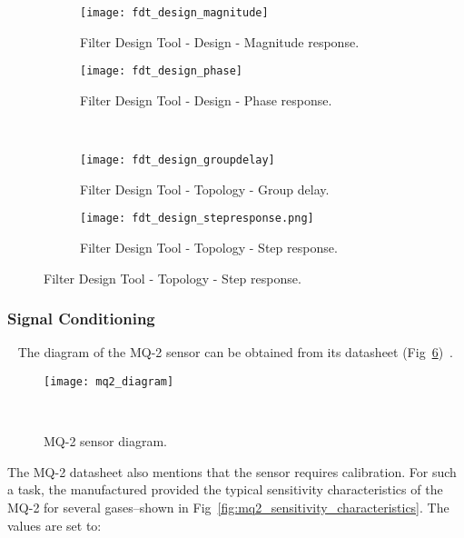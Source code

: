 \begin{figure}[H]
    \centering
    \begin{subfigure}[t]{0.9\textwidth}
        \centering
        \texttt{[image: fdt\_design\_magnitude]}
        \caption{Filter Design Tool - Design - Magnitude response.}
        \label{fig:fdt_design:magnitude}
    \end{subfigure}
    \begin{subfigure}[t]{0.9\textwidth}
        \centering
        \texttt{[image: fdt\_design\_phase]}
        \caption{Filter Design Tool - Design - Phase response.}
        \label{fig:fdt_design:phase}
    \end{subfigure}
    \\
    \centering
    \begin{subfigure}[t]{0.9\textwidth}
        \centering
        \texttt{[image: fdt\_design\_groupdelay]}
        \caption{Filter Design Tool - Topology - Group delay.}
        \label{fig:fdt_design:group_delay}
    \end{subfigure}
    \begin{subfigure}[t]{0.9\textwidth}
        \centering
        \texttt{[image: fdt\_design\_stepresponse.png]}
        \caption{Filter Design Tool - Topology - Step response.}
        \label{fig:fdt_design:step_response}
    \end{subfigure}
    \label{fig:fdt_design}
\end{figure}


\subsubsection{Signal Conditioning}
~\label{sec:methodology:dev_methodology:sc}
\hspace{8pt}
The diagram of the MQ-2 sensor can be obtained from its datasheet (Fig~\ref{fig:mq2_diagram})~\cite{mq2_datasheet}.

\begin{figure}[H]
    \centering
    \texttt{[image: mq2\_diagram]}
    \caption{MQ-2 sensor diagram.}
~\label{fig:mq2_diagram}
\end{figure}

The MQ-2 datasheet also mentions that the sensor requires calibration. For such a task, the manufactured provided the typical sensitivity characteristics of the MQ-2 for several gases--shown in Fig~\ref{fig:mq2_sensitivity_characteristics}. The values are set to:

